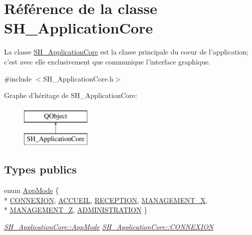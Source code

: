 \hypertarget{classSH__ApplicationCore}{\section{Référence de la classe S\-H\-\_\-\-Application\-Core}
\label{classSH__ApplicationCore}
}


La classe \hyperlink{classSH__ApplicationCore}{S\-H\-\_\-\-Application\-Core} est la classe principale du coeur de l'application; c'est avec elle exclusivement que communique l'interface graphique.  




{\ttfamily \#include $<$S\-H\-\_\-\-Application\-Core.\-h$>$}

Graphe d'héritage de S\-H\-\_\-\-Application\-Core\-:\begin{figure}[H]
\begin{center}
\leavevmode
\includegraphics[height=2.000000cm]{classSH__ApplicationCore}
\end{center}
\end{figure}
\subsection*{Types publics}
\begin{DoxyCompactItemize}
\item 
enum \hyperlink{classSH__ApplicationCore_a6b93b2f83a290305f282616eb2935899}{App\-Mode} \{ \\*
\hyperlink{classSH__ApplicationCore_a6b93b2f83a290305f282616eb2935899a3594de687d70f634e91ef60a63b74172}{C\-O\-N\-N\-E\-X\-I\-O\-N}, 
\hyperlink{classSH__ApplicationCore_a6b93b2f83a290305f282616eb2935899a1892b908076a0887805e80f590ecdef4}{A\-C\-C\-U\-E\-I\-L}, 
\hyperlink{classSH__ApplicationCore_a6b93b2f83a290305f282616eb2935899a16687d65e8feb3b768ff655d73a45916}{R\-E\-C\-E\-P\-T\-I\-O\-N}, 
\hyperlink{classSH__ApplicationCore_a6b93b2f83a290305f282616eb2935899ae3d0d6045024cbde467f9c8cb536c6a8}{M\-A\-N\-A\-G\-E\-M\-E\-N\-T\-\_\-\-X}, 
\\*
\hyperlink{classSH__ApplicationCore_a6b93b2f83a290305f282616eb2935899ad68aea91f508ecc6cc9fe1430ddccaf1}{M\-A\-N\-A\-G\-E\-M\-E\-N\-T\-\_\-\-Z}, 
\hyperlink{classSH__ApplicationCore_a6b93b2f83a290305f282616eb2935899a110d50af3f0d2f505021620359b6163b}{A\-D\-M\-I\-N\-I\-S\-T\-R\-A\-T\-I\-O\-N}
 \}
\begin{DoxyCompactList}\small\item\em \hyperlink{classSH__ApplicationCore_a6b93b2f83a290305f282616eb2935899}{S\-H\-\_\-\-Application\-Core\-::\-App\-Mode} \hyperlink{classSH__ApplicationCore_a6b93b2f83a290305f282616eb2935899a3594de687d70f634e91ef60a63b74172}{S\-H\-\_\-\-Application\-Core\-::\-C\-O\-N\-N\-E\-X\-I\-O\-N} \end{DoxyCompactList}\end{DoxyCompactItemize}
